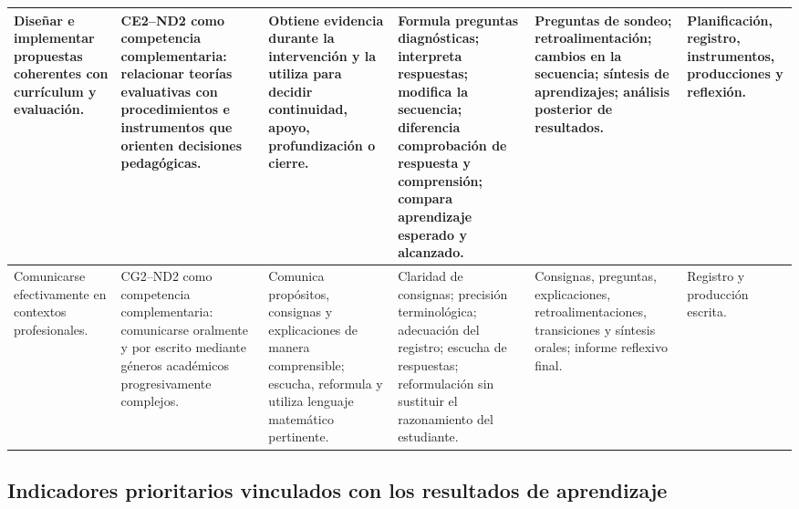 \documentclass[11pt,a4paper]{article}
\begin{document}
\begin{landscape}
\begin{longtable}{p{3.0cm}p{3.0cm}p{4.2cm}p{4.2cm}p{5.0cm}p{3.2cm}}
Diseñar e implementar propuestas coherentes con currículum y evaluación. &
CE2--ND2 como competencia complementaria: relacionar teorías evaluativas con procedimientos e instrumentos que orienten decisiones pedagógicas. &
Obtiene evidencia durante la intervención y la utiliza para decidir continuidad, apoyo, profundización o cierre. &
Formula preguntas diagnósticas; interpreta respuestas; modifica la secuencia; diferencia comprobación de respuesta y comprensión; compara aprendizaje esperado y alcanzado. &
Preguntas de sondeo; retroalimentación; cambios en la secuencia; síntesis de aprendizajes; análisis posterior de resultados. &
Planificación, registro, instrumentos, producciones y reflexión.\\
\midrule

Comunicarse efectivamente en contextos profesionales. &
CG2--ND2 como competencia complementaria: comunicarse oralmente y por escrito mediante géneros académicos progresivamente complejos. &
Comunica propósitos, consignas y explicaciones de manera comprensible; escucha, reformula y utiliza lenguaje matemático pertinente. &
Claridad de consignas; precisión terminológica; adecuación del registro; escucha de respuestas; reformulación sin sustituir el razonamiento del estudiante. &
Consignas, preguntas, explicaciones, retroalimentaciones, transiciones y síntesis orales; informe reflexivo final. &
Registro y producción escrita.\\
\bottomrule
\end{longtable}
\end{landscape}

\subsection{Indicadores prioritarios vinculados con los resultados de aprendizaje}
\end{document}
